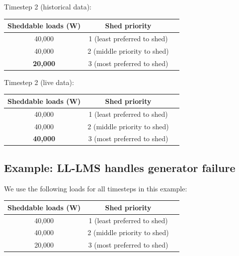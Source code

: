 \documentclass{acm_proc_article-sp}
\begin{document}
Timestep 2 (historical data): \\
\begin{tabular}{c|cc}
Sheddable loads (W) & Shed priority \\ \hline
40,000 & 1 (least preferred to shed) \\
40,000 & 2 (middle priority to shed) \\ 
{\bf 20,000} & 3 (most preferred to shed) \\ \hline
\end{tabular}

Timestep 2 (live data): \\
\begin{tabular}{c|cc}
Sheddable loads (W) & Shed priority \\ \hline
40,000 & 1 (least preferred to shed) \\
40,000 & 2 (middle priority to shed) \\ 
{\bf 40,000} & 3 (most preferred to shed) \\ \hline
\end{tabular}

\subsection{Example: LL-LMS handles generator failure}

We use the following loads for all timesteps in this example: \\
\begin{tabular}{c|cc}
Sheddable loads (W) & Shed priority \\ \hline
40,000 & 1 (least preferred to shed) \\
40,000 & 2 (middle priority to shed) \\ 
20,000 & 3 (most preferred to shed) \\ \hline
\end{tabular}
\end{document}
